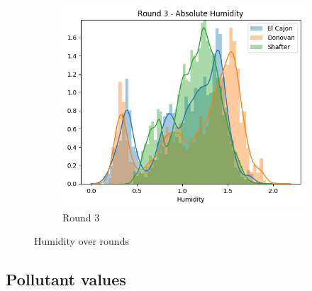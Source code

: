 \documentclass[journal abbreviation, manuscript]{copernicus}
\begin{document}
\begin{figure}[H]
\begin{subfigure}{0.32\textwidth}
\includegraphics[width=\textwidth]{results/distributions/round3_humidity.png}
\caption{Round 3}
\end{subfigure}
\caption{Humidity over rounds}
\label{fig:humidity-rounds}
\end{figure}


\subsection{Pollutant values}
\end{document}
